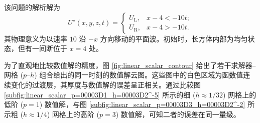 该问题的解析解为
\begin{equation}
U^{\star}(x,y,z,t)=\begin{cases}
U_{\mathrm{L}}, & x-4<-10t;\\
U_{\mathrm{R}}, & x-4>-10t.
\end{cases}
\end{equation}
其物理意义为以速率 $10$ 沿 $-x$ 方向移动的平面波。初始时，长方体内部为均匀状态，但有一间断位于 $x=4$ 处。

为了直观地比较数值解的精度，图 \ref{fig:linear_scalar_contour} 给出了若干求解器–网格 ($p$–$h$)
组合给出的同一时刻的数值解云图。这些图中的白色区域为函数值连续变化的过渡层，其厚度与数值解的误差呈正相关。通过比较图 \ref{subfig:linear_scalar_p=00003D1_h=00003D2^-5}
所示的细 ($h\approx1/32$) 网格上的低阶 ($p=1$) 数值解，与图 \ref{subfig:linear_scalar_p=00003D3_h=00003D2^-2}
所示粗 ($h\approx1/4$) 网格上的高阶 ($p=3$) 数值解，可知二者的误差在同一量级。


